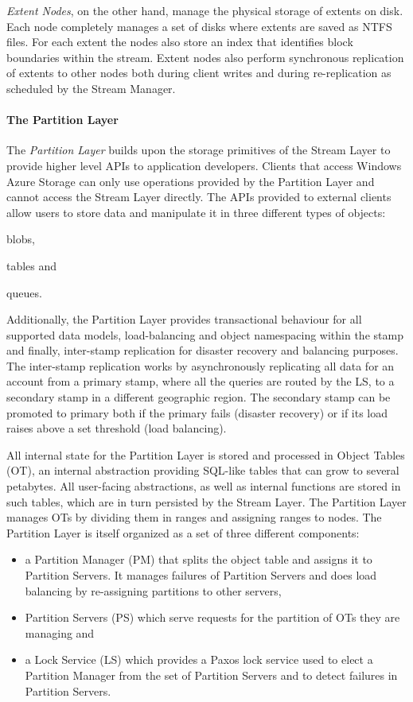 \emph{Extent Nodes}, on the other hand, manage the physical storage of extents on disk.
Each node completely manages a set of disks where extents are saved as NTFS files.
For each extent the nodes also store an index that identifies block boundaries within the stream.
Extent nodes also perform synchronous replication of extents to other nodes both during client writes and during re-replication as scheduled by the Stream Manager.

\paragraph{The Partition Layer}

The \emph{Partition Layer} builds upon the storage primitives of the Stream Layer to provide higher level APIs to application developers.
Clients that access Windows Azure Storage can only use operations provided by the Partition Layer and cannot access the Stream Layer directly.
The APIs provided to external clients allow users to store data and manipulate it in three different types of objects: \begin{inparaenum}[i)]
    \item blobs,
    \item tables and
    \item queues.
\end{inparaenum}
Additionally, the Partition Layer provides transactional behaviour for all supported data models, load-balancing and object namespacing within the stamp and finally, inter-stamp replication for disaster recovery and balancing purposes.
The inter-stamp replication works by asynchronously replicating all data for an account from a primary stamp, where all the queries are routed by the LS, to a secondary stamp in a different geographic region.
The secondary stamp can be promoted to primary both if the primary fails (disaster recovery) or if its load raises above a set threshold (load balancing).

All internal state for the Partition Layer is stored and processed in Object Tables (OT), an internal abstraction providing SQL-like tables that can grow to several petabytes.
All user-facing abstractions, as well as internal functions are stored in such tables, which are in turn persisted by the Stream Layer.
The Partition Layer manages OTs by dividing them in ranges and assigning ranges to nodes.
The Partition Layer is itself organized as a set of three different components:
\begin{itemize}
    \item a Partition Manager (PM) that splits the object table and assigns it to Partition Servers. It manages failures of Partition Servers and does load balancing by re-assigning partitions to other servers,
    \item Partition Servers (PS) which serve requests for the partition of OTs they are managing and
    \item a Lock Service (LS) which provides a Paxos \cite{DBLP:journals/tocs/Lamport98} lock service used to elect a Partition Manager from the set of Partition Servers and to detect failures in Partition Servers.
\end{itemize}